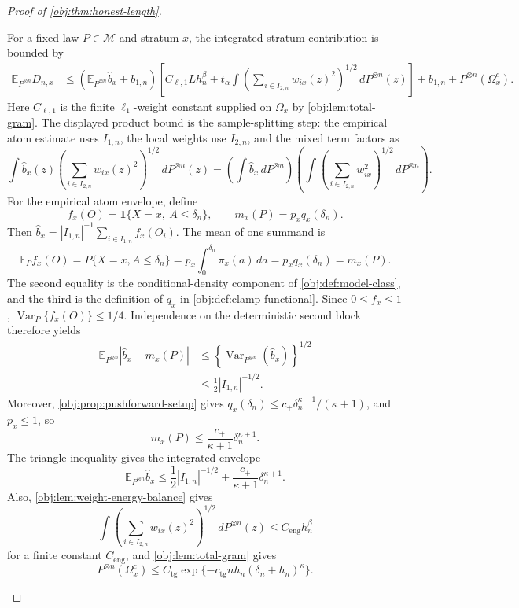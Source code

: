 \begin{proof}[Proof of \cref{obj:thm:honest-length}]
\begin{enumerate}
For a fixed law \(P\in\mathcal M\) and stratum \(x\), the integrated stratum contribution is bounded by
\[
\begin{aligned}
\mathbb E_{P^{\otimes n}}D_{n,x}
&\le
\left(\mathbb E_{P^{\otimes n}}\widehat b_x+b_{1,n}\right)
\left[ C_{\ell,1}Lh_n^\beta
+t_\alpha
\int
\left(\sum_{i\in I_{2,n}}w_{ix}(z)^2\right)^{1/2}
\,dP^{\otimes n}(z)
\right]
+b_{1,n}+P^{\otimes n}(\Omega_x^c) .
\end{aligned}
\]
Here \(C_{\ell,1}\) is the finite \(\ell_1\)-weight constant supplied on \(\Omega_x\) by
\cref{obj:lem:total-gram}. The displayed product bound is the sample-splitting step: the empirical atom
estimate uses \(I_{1,n}\), the local weights use \(I_{2,n}\), and the mixed term factors as
\[
\int \widehat b_x(z)
\left(\sum_{i\in I_{2,n}}w_{ix}(z)^2\right)^{1/2}
\,dP^{\otimes n}(z)
=
\left(\int\widehat b_x\,dP^{\otimes n}\right)
\left(\int
\left(\sum_{i\in I_{2,n}}w_{ix}^2\right)^{1/2}
\,dP^{\otimes n}\right).
\]
For the empirical atom envelope, define
\[
f_x(O)=\mathbf 1\{X=x,\ A\leq\delta_n\},
\qquad
m_x(P)=p_xq_x(\delta_n).
\]
Then \(\widehat b_x=|I_{1,n}|^{-1}\sum_{i\in I_{1,n}}f_x(O_i)\). The mean of one summand is
\[
\mathbb E_P f_x(O)
=P\{X=x,A\leq\delta_n\}
=p_x\int_0^{\delta_n}\pi_x(a)\,da
=p_xq_x(\delta_n)
=m_x(P).
\]
The second equality is the conditional-density component of \cref{obj:def:model-class}, and the third is the definition of \(q_x\) in \cref{obj:def:clamp-functional}.
Since \(0\leq f_x\leq1\), \(\operatorname{Var}_P\{f_x(O)\}\leq1/4\). Independence on the deterministic second block therefore yields
\[
\begin{aligned}
\mathbb E_{P^{\otimes n}}
\left|\widehat b_x-m_x(P)\right|
&\leq
\left\{\operatorname{Var}_{P^{\otimes n}}(\widehat b_x)\right\}^{1/2}  \\
&\leq
\frac12 |I_{1,n}|^{-1/2}.
\end{aligned}
\]
Moreover, \cref{obj:prop:pushforward-setup} gives
\(q_x(\delta_n)\leq c_+\delta_n^{\kappa+1}/(\kappa+1)\), and \(p_x\leq1\), so
\[
m_x(P)\leq \frac{c_+}{\kappa+1}\delta_n^{\kappa+1}.
\]
The triangle inequality gives the integrated envelope
\[
\mathbb E_{P^{\otimes n}}\widehat b_x
\le
\frac12 |I_{1,n}|^{-1/2}
+
\frac{c_+}{\kappa+1}\delta_n^{\kappa+1}.
\]
Also, \cref{obj:lem:weight-energy-balance} gives
\[
\int
\left(\sum_{i\in I_{2,n}}w_{ix}(z)^2\right)^{1/2}
\,dP^{\otimes n}(z)
\le C_{\mathrm{eng}}h_n^\beta
\]
for a finite constant \(C_{\mathrm{eng}}\), and \cref{obj:lem:total-gram} gives
\[
P^{\otimes n}(\Omega_x^c)
\le
C_{\mathrm{tg}}\exp\{-c_{\mathrm{tg}}n h_n(\delta_n+h_n)^\kappa\}.
\]
\end{enumerate}
\end{proof}
